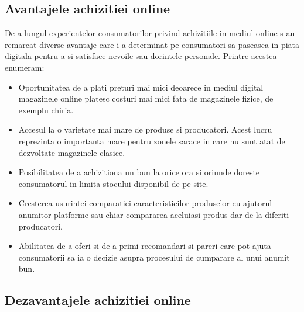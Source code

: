 \documentclass[a4paper, 12pt]{article}
\begin{document}
		\subsection{Avantajele achizitiei online}
		
		\quad\quad De-a lungul experientelor consumatorilor privind achizitiile in mediul online s-au remarcat diverse avantaje care i-a determinat pe consumatori sa paseasca in piata digitala pentru a-si satisface nevoile sau dorintele personale. Printre acestea enumeram: 
		\begin{itemize}
			\renewcommand{\labelitemi}{$\Rightarrow$}
			\item Oportunitatea de a plati preturi mai mici deoarece in mediul digital magazinele online platesc costuri mai mici fata de magazinele fizice, de exemplu chiria.
			\item  Accesul la o varietate mai mare de produse si producatori. Acest lucru reprezinta o importanta mare pentru zonele sarace in care nu sunt atat de dezvoltate magazinele clasice.
			\item Posibilitatea de a achizitiona un bun la orice ora si oriunde doreste consumatorul in limita stocului disponibil de pe site.
			\item Cresterea usurintei comparatiei caracteristicilor produselor cu ajutorul anumitor platforme sau chiar compararea aceluiasi produs dar de la diferiti producatori.
			\item Abilitatea de a  oferi si de a primi recomandari si pareri care pot ajuta consumatorii sa ia o decizie asupra procesului de cumparare al unui anumit bun.
		\end{itemize}
	
		\subsection{Dezavantajele achizitiei online}
		
\end{document}
